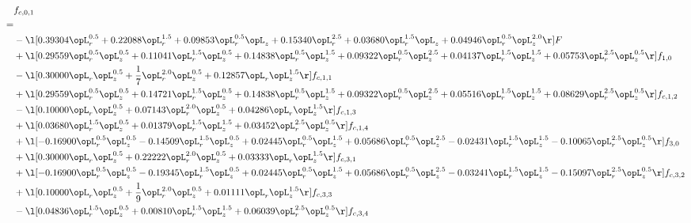 \begin{alignat}{2} 
\label{eq:f_01_1} 
& f_{c,0,1} \nonumber \\ 
 = \\ 
& - \l[  0.39304 \opL_r^{0.5} +  0.22088 \opL_r^{1.5} +  0.09853 \opL_r^{0.5} \opL_z +  0.15340 \opL_r^{2.5} +  0.03680 \opL_r^{1.5} \opL_z +  0.04946 \opL_r^{0.5} \opL_z^{2.0}  \r] F \nonumber \\ 
& + \l[  0.29559 \opL_r^{0.5} \opL_z^{0.5} +  0.11041 \opL_r^{1.5} \opL_z^{0.5} +  0.14838 \opL_r^{0.5} \opL_z^{1.5} +  0.09322 \opL_r^{0.5} \opL_z^{2.5} +  0.04137 \opL_r^{1.5} \opL_z^{1.5} +  0.05753 \opL_r^{2.5} \opL_z^{0.5}  \r] f_{1,0} \nonumber \\ 
& - \l[  0.30000 \opL_r \opL_z^{0.5} + \frac{1}{7} \opL_r^{2.0} \opL_z^{0.5} +  0.12857 \opL_r \opL_z^{1.5}  \r] f_{c,1,1} \nonumber \\ 
& + \l[  0.29559 \opL_r^{0.5} \opL_z^{0.5} +  0.14721 \opL_r^{1.5} \opL_z^{0.5} +  0.14838 \opL_r^{0.5} \opL_z^{1.5} +  0.09322 \opL_r^{0.5} \opL_z^{2.5} +  0.05516 \opL_r^{1.5} \opL_z^{1.5} +  0.08629 \opL_r^{2.5} \opL_z^{0.5}  \r] f_{c,1,2} \nonumber \\ 
& - \l[  0.10000 \opL_r \opL_z^{0.5} +  0.07143 \opL_r^{2.0} \opL_z^{0.5} +  0.04286 \opL_r \opL_z^{1.5}  \r] f_{c,1,3} \nonumber \\ 
& + \l[  0.03680 \opL_r^{1.5} \opL_z^{0.5} +  0.01379 \opL_r^{1.5} \opL_z^{1.5} +  0.03452 \opL_r^{2.5} \opL_z^{0.5}  \r] f_{c,1,4} \nonumber \\ 
& + \l[  -0.16900 \opL_r^{0.5} \opL_z^{0.5}   -0.14509 \opL_r^{1.5} \opL_z^{0.5} +  0.02445 \opL_r^{0.5} \opL_z^{1.5} +  0.05686 \opL_r^{0.5} \opL_z^{2.5}   -0.02431 \opL_r^{1.5} \opL_z^{1.5}   -0.10065 \opL_r^{2.5} \opL_z^{0.5}  \r] f_{3,0} \nonumber \\ 
& + \l[  0.30000 \opL_r \opL_z^{0.5} +  0.22222 \opL_r^{2.0} \opL_z^{0.5} +  0.03333 \opL_r \opL_z^{1.5}  \r] f_{c,3,1} \nonumber \\ 
& + \l[  -0.16900 \opL_r^{0.5} \opL_z^{0.5}   -0.19345 \opL_r^{1.5} \opL_z^{0.5} +  0.02445 \opL_r^{0.5} \opL_z^{1.5} +  0.05686 \opL_r^{0.5} \opL_z^{2.5}   -0.03241 \opL_r^{1.5} \opL_z^{1.5}   -0.15097 \opL_r^{2.5} \opL_z^{0.5}  \r] f_{c,3,2} \nonumber \\ 
& + \l[  0.10000 \opL_r \opL_z^{0.5} + \frac{1}{9} \opL_r^{2.0} \opL_z^{0.5} +  0.01111 \opL_r \opL_z^{1.5}  \r] f_{c,3,3} \nonumber \\ 
& - \l[  0.04836 \opL_r^{1.5} \opL_z^{0.5} +  0.00810 \opL_r^{1.5} \opL_z^{1.5} +  0.06039 \opL_r^{2.5} \opL_z^{0.5}  \r] f_{c,3,4} \nonumber \\ 

\end{alignat}
